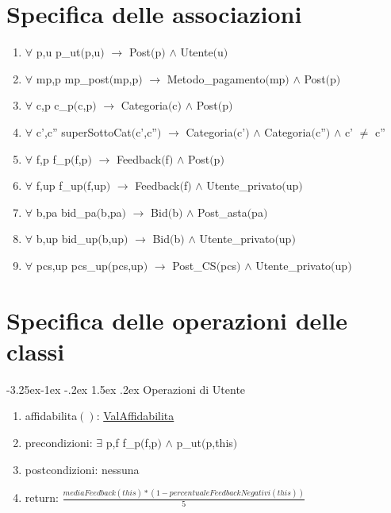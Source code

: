 \documentclass{article}
\makeatletter
\renewcommand\subsection{\@startsection{subsection}{2}{\z@}%
                                     {-3.25ex\@plus-1ex \@minus-.2ex}%
                                     {1.5ex \@plus.2ex}%
                                     {\normalfont\normalsize\bfseries}}
\makeatother
\begin{document}
\newpage
\section{\label{sec:SpecificaAssociazioni}Specifica delle associazioni}
\begin{enumerate}
    \item $\forall$ p,u p\_ut$($p,u$)$ $\rightarrow$ Post$($p$)$ $\land$ Utente$($u$)$
    \item $\forall$ mp,p mp\_post$($mp,p$)$ $\rightarrow$ Metodo\_pagamento$($mp$)$ $\land$ Post$($p$)$
    \item $\forall$ c,p c\_p$($c,p$)$ $\rightarrow$ Categoria$($c$)$ $\land$ Post$($p$)$
    \item $\forall$ c',c'' superSottoCat$($c',c''$)$ $\rightarrow$ Categoria$($c'$)$ $\land$ Categoria$($c''$)$ $\land$ c' $\neq$ c''
    \item $\forall$ f,p f\_p$($f,p$)$ $\rightarrow$ Feedback$($f$)$ $\land$ Post$($p$)$
    \item $\forall$ f,up f\_up$($f,up$)$ $\rightarrow$ Feedback$($f$)$ $\land$ Utente\_privato$($up$)$
    \item $\forall$ b,pa bid\_pa$($b,pa$)$ $\rightarrow$ Bid$($b$)$ $\land$ Post\_asta$($pa$)$
    \item $\forall$ b,up bid\_up$($b,up$)$ $\rightarrow$ Bid$($b$)$ $\land$ Utente\_privato$($up$)$
    \item $\forall$ pcs,up pcs\_up$($pcs,up$)$ $\rightarrow$ Post\_CS$($pcs$)$ $\land$ Utente\_privato$($up$)$
\end{enumerate}

\newpage
\section{\label{sec:SpecificaOperazioniClassi}Specifica delle operazioni delle classi}

\subsection{\label{sec:OperazioniUtente}Operazioni di Utente}

\begin{enumerate}
    \item\label{sec:OperazioniUtenteAffidabilita}affidabilita$()$: \hyperref[sec:TipoValAffidabilita]{ValAffidabilita}
    \item precondizioni: $\exists$ p,f f\_p$($f,p$)$ $\land$ p\_ut$($p,this$)$
    \item postcondizioni: nessuna
    \item return: $\frac{mediaFeedback(this) * (1 - percentualeFeedbackNegativi(this))}{5}$
\end{enumerate}
\end{document}
